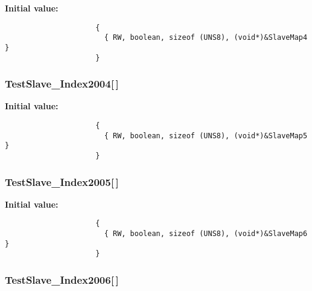\textbf{Initial value:}

\begin{Code}\begin{verbatim} 
                     {
                       { RW, boolean, sizeof (UNS8), (void*)&SlaveMap4 }
                     }
\end{verbatim}\end{Code}
\subsubsection{ {\bf Test\-Slave\_\-Index2004}[$\,$]}\label{TestSlave_8c_4da3240b0a1fc7b6672aaade5c0f8120}


\textbf{Initial value:}

\begin{Code}\begin{verbatim} 
                     {
                       { RW, boolean, sizeof (UNS8), (void*)&SlaveMap5 }
                     }
\end{verbatim}\end{Code}
\subsubsection{ {\bf Test\-Slave\_\-Index2005}[$\,$]}\label{TestSlave_8c_5f483d7eb6346ab0f34599a73f87adf3}


\textbf{Initial value:}

\begin{Code}\begin{verbatim} 
                     {
                       { RW, boolean, sizeof (UNS8), (void*)&SlaveMap6 }
                     }
\end{verbatim}\end{Code}
\subsubsection{ {\bf Test\-Slave\_\-Index2006}[$\,$]}\label{TestSlave_8c_4c7c2bcf523f6c839f744be219ba9920}


